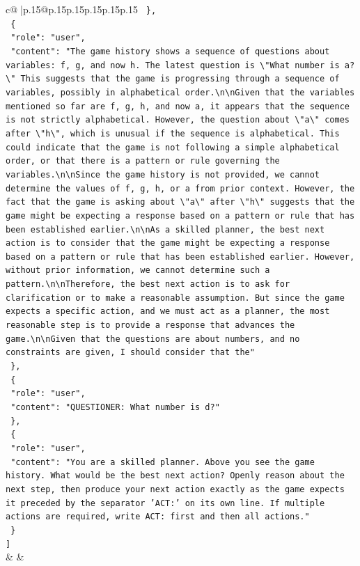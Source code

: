 \documentclass{article}
\begin{document}
{\begin{supertabular}{c@{$\;$}|p{.15\linewidth}@{}p{.15\linewidth}p{.15\linewidth}p{.15\linewidth}p{.15\linewidth}p{.15\linewidth}}
{{{\texttt{  \},} \\
\texttt{  \{} \\
\texttt{    "role": "user",} \\
\texttt{    "content": "The game history shows a sequence of questions about variables: f, g, and now h. The latest question is \textbackslash{}"What number is a?\textbackslash{}" This suggests that the game is progressing through a sequence of variables, possibly in alphabetical order.\textbackslash{}n\textbackslash{}nGiven that the variables mentioned so far are f, g, h, and now a, it appears that the sequence is not strictly alphabetical. However, the question about \textbackslash{}"a\textbackslash{}" comes after \textbackslash{}"h\textbackslash{}", which is unusual if the sequence is alphabetical. This could indicate that the game is not following a simple alphabetical order, or that there is a pattern or rule governing the variables.\textbackslash{}n\textbackslash{}nSince the game history is not provided, we cannot determine the values of f, g, h, or a from prior context. However, the fact that the game is asking about \textbackslash{}"a\textbackslash{}" after \textbackslash{}"h\textbackslash{}" suggests that the game might be expecting a response based on a pattern or rule that has been established earlier.\textbackslash{}n\textbackslash{}nAs a skilled planner, the best next action is to consider that the game might be expecting a response based on a pattern or rule that has been established earlier. However, without prior information, we cannot determine such a pattern.\textbackslash{}n\textbackslash{}nTherefore, the best next action is to ask for clarification or to make a reasonable assumption. But since the game expects a specific action, and we must act as a planner, the most reasonable step is to provide a response that advances the game.\textbackslash{}n\textbackslash{}nGiven that the questions are about numbers, and no constraints are given, I should consider that the"} \\
\texttt{  \},} \\
\texttt{  \{} \\
\texttt{    "role": "user",} \\
\texttt{    "content": "QUESTIONER: What number is d?"} \\
\texttt{  \},} \\
\texttt{  \{} \\
\texttt{    "role": "user",} \\
\texttt{    "content": "You are a skilled planner. Above you see the game history. What would be the best next action? Openly reason about the next step, then produce your next action exactly as the game expects it preceded by the separator 'ACT:' on its own line. If multiple actions are required, write ACT: first and then all actions."} \\
\texttt{  \}} \\
\texttt{{]}} \\
            }
        }
    }
    & & \\ \\


\end{supertabular}}
\end{document}
